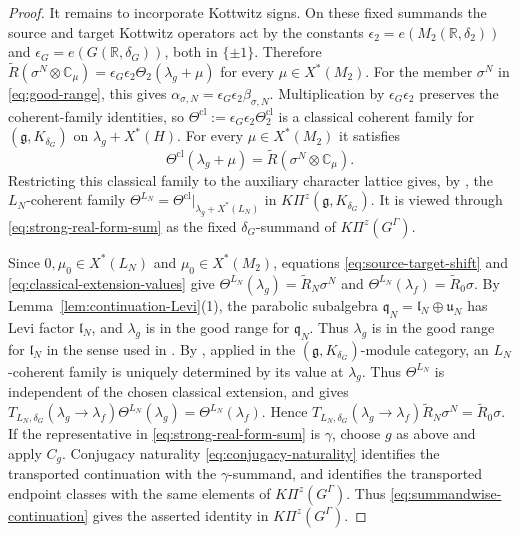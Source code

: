 \documentclass[10pt]{amsart}
\numberwithin{equation}{section}
\theoremstyle{plain}
\theoremstyle{definition}
\theoremstyle{remark}
\newcommand{\CC}{\mathbb C}
\newcommand{\RR}{\mathbb R}
\newcommand{\fq}{\mathfrak q}
\newcommand{\fu}{\mathfrak u}
\begin{document}
\begin{proof}
It remains to incorporate Kottwitz signs. On these fixed summands the
source and target Kottwitz operators act by
the constants $\epsilon_2=e(M_2(\RR,\delta_2))$ and
$\epsilon_G=e(G(\RR,\delta_G))$, both in $\{\pm1\}$. Therefore
$\widetilde R(\sigma^N\otimes\CC_\mu)=
\epsilon_G\epsilon_2\Theta_2(\lambda_g+\mu)$ for every
$\mu\in X^*(M_2)$.
For the member $\sigma^N$ in \eqref{eq:good-range}, this gives
$\alpha_{\sigma,N}=\epsilon_G\epsilon_2\beta_{\sigma,N}$. Multiplication by
$\epsilon_G\epsilon_2$ preserves the coherent-family identities, so
$\Theta^{\mathrm{cl}}:=\epsilon_G\epsilon_2\Theta_2^{\mathrm{cl}}$
is a classical coherent family for $(\mathfrak g,K_{\delta_G})$ on
$\lambda_g+X^*(H)$. For every $\mu\in X^*(M_2)$ it
satisfies
\begin{equation}\label{eq:classical-extension-values}
 \Theta^{\mathrm{cl}}(\lambda_g+\mu)
 =
 \widetilde R(\sigma^N\otimes\CC_\mu).
\end{equation}
Restricting this classical family to the auxiliary character lattice
gives, by \cite[Definition~2.10.1]{AIMV26}, the $L_N$-coherent family
$\Theta^{L_N}=\Theta^{\mathrm{cl}}|_{\lambda_g+X^*(L_N)}$ in
$K\Pi^z(\mathfrak g,K_{\delta_G})$.
It is viewed through \eqref{eq:strong-real-form-sum} as the fixed
$\delta_G$-summand of $K\Pi^z(G^\Gamma)$.

Since $0,\mu_0\in X^*(L_N)$ and
$\mu_0\in X^*(M_2)$, equations
\eqref{eq:source-target-shift} and
\eqref{eq:classical-extension-values} give
$\Theta^{L_N}(\lambda_g)=\widetilde R_N\sigma^N$ and
$\Theta^{L_N}(\lambda_f)=\widetilde R_0\sigma$.
By Lemma~\ref{lem:continuation-Levi}(1), the parabolic subalgebra
$\fq_N=\mathfrak l_N\oplus\fu_N$ has Levi factor $\mathfrak l_N$, and
$\lambda_g$ is in the good range for $\fq_N$. Thus $\lambda_g$ is in the
good range for $\mathfrak l_N$ in the sense used in
\cite[Definition~2.5.3]{AIMV26}. By \cite[Proposition~2.10.2]{AIMV26},
applied in the $(\mathfrak g,K_{\delta_G})$-module category, an
$L_N$-coherent family is uniquely determined by its value at $\lambda_g$.
Thus $\Theta^{L_N}$ is independent of the chosen classical extension, and
\cite[Definition~2.10.3]{AIMV26} gives
$T_{L_N,\delta_G}(\lambda_g\to\lambda_f)
\Theta^{L_N}(\lambda_g)=\Theta^{L_N}(\lambda_f)$. Hence
$T_{L_N,\delta_G}(\lambda_g\to\lambda_f)\widetilde R_N\sigma^N
=\widetilde R_0\sigma$.
If the representative in \eqref{eq:strong-real-form-sum} is $\gamma$,
choose $g$ as above and apply $C_g$. Conjugacy naturality
\eqref{eq:conjugacy-naturality} identifies the transported continuation
with the $\gamma$-summand, and \cite[Definition~2.4.2]{AIMV26} identifies
the transported endpoint classes with the same elements of
$K\Pi^z(G^\Gamma)$. Thus \eqref{eq:summandwise-continuation} gives the
asserted identity in $K\Pi^z(G^\Gamma)$.
\end{proof}
\end{document}
